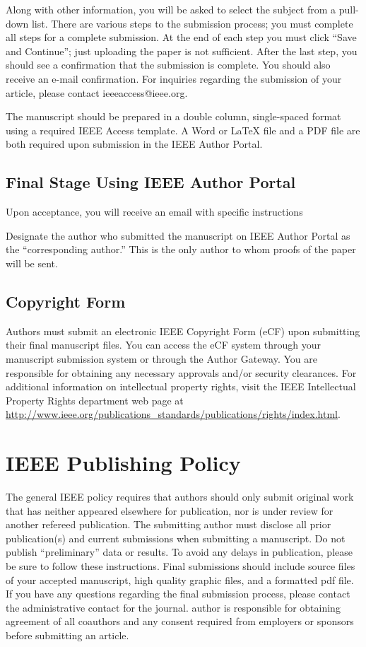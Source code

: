 \documentclass{ieeeaccess}
\begin{document}
Along with other information, you will be asked to select the subject from a
pull-down list. There are various steps to the
submission process; you must complete all steps for a complete submission.
At the end of each step you must click ``Save and Continue''; just uploading
the paper is not sufficient. After the last step, you should see a
confirmation that the submission is complete. You should also receive an
e-mail confirmation. For inquiries regarding the submission of your article, please contact ieeeaccess@ieee.org.

The manuscript should be prepared in a double column, single-spaced format using a required IEEE Access template.
A Word or LaTeX file and a PDF file are both required upon submission in the IEEE Author Portal.

\subsection{Final Stage Using IEEE Author Portal}
Upon acceptance, you will receive an email with specific instructions

Designate the author who submitted the manuscript on
IEEE Author Portal as the ``corresponding author.'' This is the only
author to whom proofs of the paper will be sent.

\subsection{Copyright Form}
Authors must submit an electronic IEEE Copyright Form (eCF) upon submitting
their final manuscript files. You can access the eCF system through your
manuscript submission system or through the Author Gateway. You are
responsible for obtaining any necessary approvals and/or security
clearances. For additional information on intellectual property rights,
visit the IEEE Intellectual Property Rights department web page at
\underline{http://www.ieee.org/publications\_standards/publications/}\break\underline{rights/index.html}.

\section{\break IEEE Publishing Policy}
The general IEEE policy requires that authors should only submit original
work that has neither appeared elsewhere for publication, nor is under
review for another refereed publication. The submitting author must disclose
all prior publication(s) and current submissions when submitting a
manuscript. Do not publish ``preliminary'' data or results. To avoid any delays in
publication, please be sure to follow these instructions.  Final
submissions should include source files of your accepted manuscript, high
quality graphic files, and a formatted pdf file. If you have any questions
regarding the final submission process, please contact the administrative
contact for the journal.
author is responsible for obtaining agreement of all coauthors and any
consent required from employers or sponsors before submitting an article.
\end{document}
